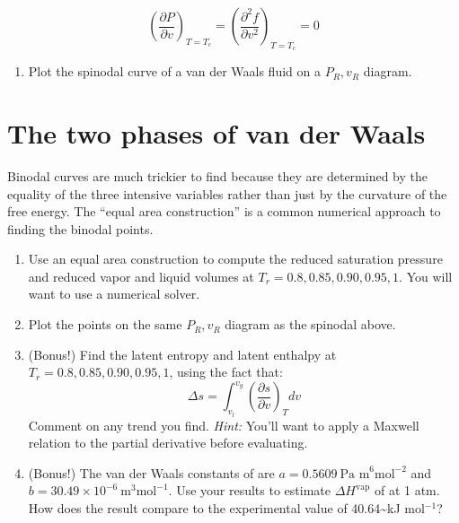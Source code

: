 \documentclass[11pt]{article}
\begin{document}
\begin{equation*}
  \left ( \frac{\partial P}{\partial v} \right )_{T=T_c} = \left (
    \frac{\partial^2 f}{\partial v^2} \right )_{T=T_c} = 0
\end{equation*}

\begin{enumerate}
\item Plot the spinodal curve of a van der Waals fluid on a \(P_R, v_R\) diagram.
\end{enumerate}

\section{The two phases of van der Waals}
\label{sec:org27c4a42}
Binodal curves are much trickier to find because they are determined by the equality of the three intensive variables rather than just by the curvature of the free energy.  The ``equal area construction'' is a common numerical approach to finding the binodal points.

\begin{enumerate}
\item Use an equal area construction to compute the reduced saturation pressure and
reduced vapor and liquid volumes at \(T_r = 0.8, 0.85, 0.90, 0.95, 1\).  You will want
to use a numerical solver.

\item Plot the points on the same \(P_R, v_R\) diagram as the spinodal above.

\item (Bonus!) Find the latent entropy and latent enthalpy at  \(T_r = 0.8, 0.85, 0.90, 0.95, 1\), using the fact that:
\begin{equation*}
  \Delta s = \int_{v_l}^{v_g} \left ( \frac{\partial s}{\partial v} \right )_T dv
\end{equation*}
Comment on any trend you find. \textit{Hint:} You'll want to apply a Maxwell relation to the partial derivative before evaluating.

\item (Bonus!) The van der Waals constants of  are \(a = 0.5609~\text{Pa
      m}^6\text{mol}^{-2}\) and \(b = 30.49\times10^{-6}~\text{m}^3\text{mol}^{-1}\).  Use
your results to estimate \(\Delta H^\text{vap}\) of  at 1 atm.  How does the result compare to the experimental value of 40.64\textasciitilde{}kJ mol\(^{-1}\)?
\end{enumerate}
\end{document}
